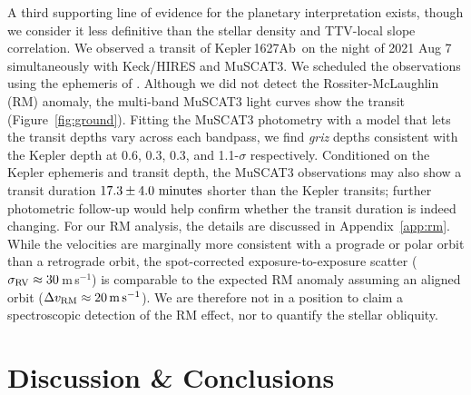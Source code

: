 \documentclass[12pt,modern,twocolumn,tighten]{aastex63}
\newcommand{\pn}{Kepler\,1627Ab} %
\newcommand{\ms}{\,m\,s$^{-1}$}
\begin{document}
A third supporting line of evidence for the planetary interpretation
exists, though we consider it less definitive than the stellar density
and TTV-local slope correlation.  We observed a transit of \pn\ on the
night of 2021 Aug 7 simultaneously with Keck/HIRES and MuSCAT3.  We
scheduled the observations using the ephemeris of
\citet{holczer_transit_2016}.  Although we did not detect the
Rossiter-McLaughlin (RM) anomaly, the multi-band MuSCAT3 light curves
show the transit (Figure~\ref{fig:ground}).  Fitting the MuSCAT3
photometry with a model that lets the transit depths vary across each
bandpass, we find {\it griz} depths consistent with the Kepler depth
at 0.6, 0.3, 0.3, and 1.1-$\sigma$ respectively.  Conditioned on the
Kepler ephemeris and transit depth, the MuSCAT3 observations may also
show a transit duration $17.3\pm4.0\ {\rm minutes}$ shorter than the
Kepler transits; further photometric follow-up would help confirm
whether the transit duration is indeed changing.  For our RM analysis,
the details are discussed in Appendix~\ref{app:rm}.  While the
velocities are marginally more consistent with a prograde or polar
orbit than a retrograde orbit, the spot-corrected exposure-to-exposure
scatter ($\sigma_{\rm RV}\approx 30$\ms) is comparable to the expected
RM anomaly assuming an aligned orbit ($\Delta v_{\rm RM}\approx
20\,{\rm m\,s}^{-1}$).  We are therefore not in a position to claim a
spectroscopic detection of the RM effect, nor to quantify the stellar
obliquity.


\section{Discussion \& Conclusions}
\label{sec:conc}
\end{document}
